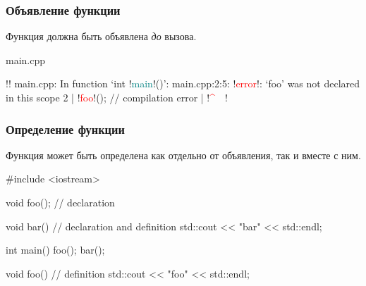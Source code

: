 \documentclass[compress, 8pt, aspectratio=169]{beamer}
\begin{document}
\begin{frame}[fragile]

    \frametitle{Объявление функции}

    Функция должна быть объявлена \textit{до} вызова.

        {main.cpp}

    \begin{terminalwindow}
!!
main.cpp: In function ‘int !\textcolor{teal}{main}!()’:
main.cpp:2:5: !\textcolor{red}{error}!: ‘foo’ was not declared in this scope
    2 |     !\textcolor{red}{foo}!(); // compilation error
      |     !\textcolor{red}{\^{}~~}!
    \end{terminalwindow}

\end{frame}

\begin{frame}[fragile]

    \frametitle{Определение функции}

    Функция может быть определена как отдельно от объявления, так и вместе с ним.

    \begin{myinplacelisting}[minted language=cpp]
#include <iostream>

void foo(); // declaration

void bar() { // declaration and definition
    std::cout << "bar" << std::endl;
}

int main() {
    foo();
    bar();
}

void foo() { // definition
    std::cout << "foo" << std::endl;
}
    \end{myinplacelisting}

\end{frame}
\end{document}
